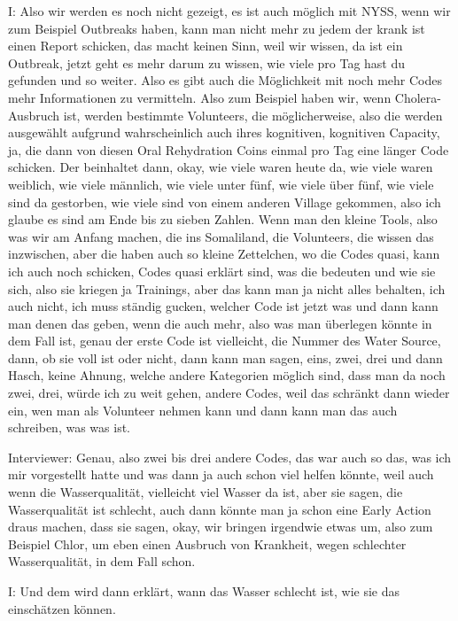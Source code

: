 I: Also wir werden es noch nicht gezeigt, es ist auch möglich mit NYSS, wenn wir zum Beispiel Outbreaks haben, kann man nicht mehr zu jedem der krank ist einen Report schicken, das macht keinen Sinn, weil wir wissen, da ist ein Outbreak, jetzt geht es mehr darum zu wissen, wie viele pro Tag hast du gefunden und so weiter. Also es gibt auch die Möglichkeit mit noch mehr Codes mehr Informationen zu vermitteln. Also zum Beispiel haben wir, wenn Cholera-Ausbruch ist, werden bestimmte Volunteers, die möglicherweise, also die werden ausgewählt aufgrund wahrscheinlich auch ihres kognitiven, kognitiven Capacity, ja, die dann von diesen Oral Rehydration Coins einmal pro Tag eine länger Code schicken. Der beinhaltet dann, okay, wie viele waren heute da, wie viele waren weiblich, wie viele männlich, wie viele unter fünf, wie viele über fünf, wie viele sind da gestorben, wie viele sind von einem anderen Village gekommen, also ich glaube es sind am Ende bis zu sieben Zahlen. Wenn man den kleine Tools, also was wir am Anfang machen, die ins Somaliland, die Volunteers, die wissen das inzwischen, aber die haben auch so kleine Zettelchen, wo die Codes quasi, kann ich auch noch schicken, Codes quasi erklärt sind, was die bedeuten und wie sie sich, also sie kriegen ja Trainings, aber das kann man ja nicht alles behalten, ich auch nicht, ich muss ständig gucken, welcher Code ist jetzt was und dann kann man denen das geben, wenn die auch mehr, also was man überlegen könnte in dem Fall ist, genau der erste Code ist vielleicht, die Nummer des Water Source, dann, ob sie voll ist oder nicht, dann kann man sagen, eins, zwei, drei und dann Hasch, keine Ahnung, welche andere Kategorien möglich sind, dass man da noch zwei, drei, würde ich zu weit gehen, andere Codes, weil das schränkt dann wieder ein, wen man als Volunteer nehmen kann und dann kann man das auch schreiben, was was ist. 

Interviewer: Genau, also zwei bis drei andere Codes, das war auch so das, was ich mir vorgestellt hatte und was dann ja auch schon viel helfen könnte, weil auch wenn die Wasserqualität, vielleicht viel Wasser da ist, aber sie sagen, die Wasserqualität ist schlecht, auch dann könnte man ja schon eine Early Action draus machen, dass sie sagen, okay, wir bringen irgendwie etwas um, also zum Beispiel Chlor, um eben einen Ausbruch von Krankheit, wegen schlechter Wasserqualität, in dem Fall schon. 

I: Und dem wird dann erklärt, wann das Wasser schlecht ist, wie sie das einschätzen können. 

